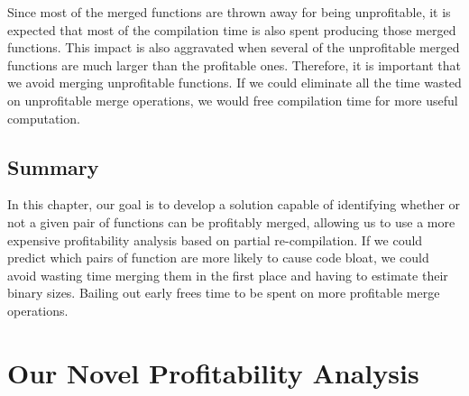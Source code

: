 
Since most of the merged functions are thrown away for being unprofitable, it is expected that most of the compilation time is also spent producing those merged functions.
This impact is also aggravated when several of the unprofitable merged functions are much larger than the profitable ones.
Therefore, it is important that we avoid merging unprofitable functions.
If we could eliminate all the time wasted on unprofitable merge operations, we would free compilation time for more useful computation.



\subsection{Summary}

In this chapter, our goal is to develop a solution capable of identifying whether or not a given pair of functions can be profitably merged, allowing us to use a more expensive profitability analysis based on partial re-compilation.
If we could predict which pairs of function are more likely to cause code bloat, we could avoid wasting time merging them in the first place and having to estimate their binary sizes.
Bailing out early frees time to be spent on more profitable merge operations.


\section{Our Novel Profitability Analysis}

